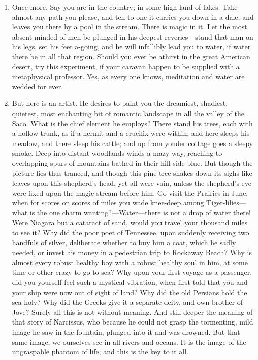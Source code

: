 \documentclass{../armymemo}
\begin{document}
\begin{enumerate}
\begin{enumerate}
  \item Once more. Say you are in the country; in some high land of lakes. Take
    almost any path you please, and ten to one it carries you down in a dale,
    and leaves you there by a pool in the stream. There is magic in it. Let the
    most absent-minded of men be plunged in his deepest reveries—stand that man
    on his legs, set his feet a-going, and he will infallibly lead you to water,
    if water there be in all that region.  Should you ever be athirst in the
    great American desert, try this experiment, if your caravan happen to be
    supplied with a metaphysical professor. Yes, as every one knows, meditation
    and water are wedded for ever.

  \item But here is an artist. He desires to paint you the dreamiest, shadiest,
    quietest, most enchanting bit of romantic landscape in all the valley of the
    Saco. What is the chief element he employs? There stand his trees, each with
    a hollow trunk, as if a hermit and a crucifix were within; and here sleeps
    his meadow, and there sleep his cattle; and up from yonder cottage goes a
    sleepy smoke. Deep into distant woodlands winds a mazy way, reaching to
    overlapping spurs of mountains bathed in their hill-side blue. But though
    the picture lies thus tranced, and though this pine-tree shakes down its
    sighs like leaves upon this shepherd’s head, yet all were vain, unless the
    shepherd’s eye were fixed upon the magic stream before him. Go visit the
    Prairies in June, when for scores on scores of miles you wade knee-deep
    among Tiger-lilies—what is the one charm wanting?—Water—there is not a drop
    of water there! Were Niagara but a cataract of sand, would you travel your
    thousand miles to see it? Why did the poor poet of Tennessee, upon suddenly
    receiving two handfuls of silver, deliberate whether to buy him a coat,
    which he sadly needed, or invest his money in a pedestrian trip to Rockaway
    Beach? Why is almost every robust healthy boy with a robust healthy soul in
    him, at some time or other crazy to go to sea?  Why upon your first voyage
    as a passenger, did you yourself feel such a mystical vibration, when first
    told that you and your ship were now out of sight of land? Why did the old
    Persians hold the sea holy? Why did the Greeks give it a separate deity, and
    own brother of Jove? Surely all this is not without meaning. And still
    deeper the meaning of that story of Narcissus, who because he could not
    grasp the tormenting, mild image he saw in the fountain, plunged into it and
    was drowned. But that same image, we ourselves see in all rivers and
    oceans. It is the image of the ungraspable phantom of life; and this is the
    key to it all.
    

\end{enumerate}
\end{enumerate}
\end{document}
